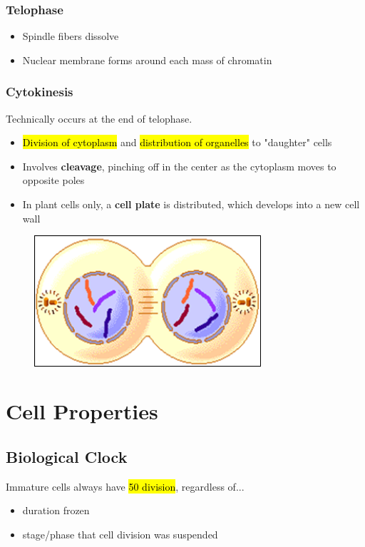\documentclass[a4paper,12pt]{article}
\begin{document}
\subsubsection{Telophase}
\begin{itemize}
    \item{Spindle fibers dissolve}
    \item{Nuclear membrane forms around each mass of chromatin}
\end{itemize}

\subsubsection{Cytokinesis}
Technically occurs at the end of telophase.
\begin{itemize}
    \item{\hl{Division of cytoplasm} and \hl{distribution of organelles} to "daughter" cells}
    \item{Involves \textbf{cleavage}, pinching off in the center as the cytoplasm moves to opposite poles}
    \item{In plant cells only, a \textbf{cell plate} is distributed, which develops into a new cell wall}
\end{itemize}

\begin{figure}[H]
    \centering
    \includegraphics[width=0.75\textwidth]{telophase}
\end{figure}

\section{Cell Properties}

\subsection{Biological Clock}\noindent

Immature cells always have \hl{50 division}, regardless of...
\begin{itemize}
    \item{duration frozen}
    \item{stage/phase that cell division was suspended}
\end{itemize}
\end{document}
